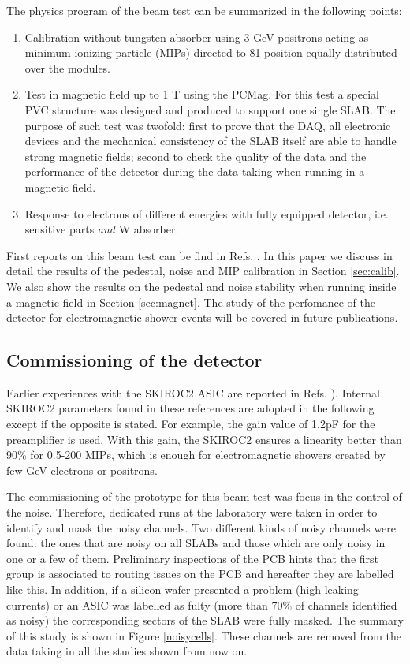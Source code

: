 \documentclass[final,3p,times,twocolumn]{elsarticle}
\begin{document}
The physics program of the beam test can be summarized in the following points:

\begin{enumerate}
\item Calibration without tungsten absorber using 3 GeV positrons acting as minimum ionizing particle (MIPs) directed to 81 position equally distributed over the modules.
\item Test in magnetic field up to 1 T using the PCMag. For this test a special PVC structure was
designed and produced to support one single SLAB.	
The purpose of such test was twofold: first to prove that the DAQ, all electronic devices and the 
mechanical consistency of the SLAB itself are able
to handle strong magnetic fields; 
second to check the quality of the data and the performance of the detector during the data taking when running
in a magnetic field.
\item Response to electrons of different energies with fully equipped detector, i.e. sensitive parts {\it and} W absorber.
\end{enumerate}

First reports on this beam test can be find in
Refs. \cite{Irles:2018uum,Irles:2018hcd}. In this paper we discuss in detail
the results of the pedestal, noise and MIP calibration in Section \ref{sec:calib}.
We also show the results on the pedestal and noise stability when running inside
a magnetic field in Section \ref{sec:magnet}. The study of the perfomance of the detector
for electromagnetic shower events will be covered in future publications.

\subsection{Commissioning of the detector}
\label{sec:commissioning}

Earlier experiences with the SKIROC2 ASIC are reported in Refs. \cite{Amjad:2014tha,Suehara:2018mqk}). 
Internal SKIROC2 parameters found in these references are adopted in the following
except if the opposite is stated.
For example, the gain value of 1.2pF for the preamplifier is used. 
With this gain, the SKIROC2 ensures a linearity better than 90\% 
for 0.5-200 MIPs, which is enough for 
electromagnetic showers created by few GeV 
electrons or positrons.

The commissioning of the prototype for this beam test was focus in
the control of the noise. Therefore, dedicated runs at the laboratory were taken
in order to identify and mask the noisy channels.
Two different kinds of noisy channels were found: the ones that are noisy on all
SLABs and those which are only noisy in one or a few of them. Preliminary inspections
of the PCB hints that the first group is associated to routing issues on the PCB and
hereafter they are labelled like this. In addition, if a silicon wafer presented a problem
(high leaking currents) or an ASIC was labelled as fulty (more than 70\% of channels identified as noisy)
the corresponding sectors of the SLAB were fully masked.
The summary of this study is shown in Figure \ref{noisycells}.
These channels are removed from the data taking in all the studies shown from now on.
\end{document}
